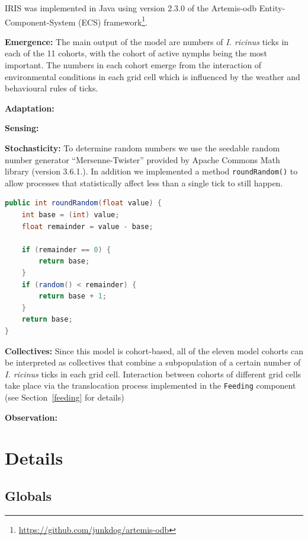 \documentclass[a4paper, 11pt]{scrartcl}
\newcommand{\inlinecode}[1]{\texttt{\small #1}}
\begin{document}
IRIS was implemented in Java using version 2.3.0 of the Artemis-odb Entity-Component-System (ECS) framework\footnote{\url{https://github.com/junkdog/artemis-odb}}.


\textbf{Emergence:} The main output of the model are numbers of \emph{I. ricinus} ticks in each of the 11 cohorts, with the cohort of active nymphs being the most important. The numbers in each cohort emerge from the interaction of environmental conditions in each grid cell which is influenced by the weather and behavioural rules of ticks.

\textbf{Adaptation:}

\textbf{Sensing:}

\textbf{Stochasticity:} To determine random numbers we use the seedable random number generator ``Mersenne-Twister'' provided by Apache Commons Math library (version 3.6.1.). In addition we implemented a method \inlinecode{roundRandom()} to allow processes that statistically affect less than a single tick to still happen.

\begin{lstlisting}[language = Java, caption = {Overview of roundRandom() method}]
public int roundRandom(float value) {
	int base = (int) value;
	float remainder = value - base;
	
	if (remainder == 0) {
		return base;
	}
	if (random() < remainder) {
		return base + 1;
	}
	return base;
}
\end{lstlisting}


\textbf{Collectives:} Since this model is cohort-based, all of the eleven model cohorts can be interpreted as collectives that combine a subpopulation of a certain number of \emph{I. ricinus} ticks in each grid cell. Interaction between cohorts of different grid cells take place via the translocation process implemented in the \inlinecode{Feeding} component (see Section~\ref{feeding} for details)

\textbf{Observation:}



\newpage


\section{Details}

\subsection{Globals}
\end{document}
